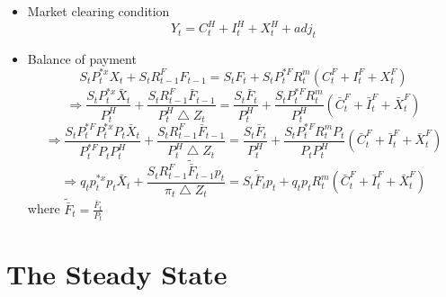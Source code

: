 \documentclass[11pt, a4paper]{article}
\begin{document}
\begin{itemize}
\item Market clearing condition
\[Y_t = C_t^H + I_t^H + X_t^H + adj_t\]
\item Balance of payment 
\[ S_t P_t^{*x}X_t + S_t R_{t-1}^F F_{t-1} = S_t F_t + S_t P_t^{*F}R_t^m (C_t^F + I_t^F + X_t^F)\]
\begin{equation*}
\Rightarrow \frac{S_t P_t^{*x}\bar{X}_t}{P_t^H} + \frac{S_t R_{t-1}^F \bar{F}_{t-1}}{P_t^H \bigtriangleup Z_t} = \frac{S_t \bar{F}_t}{P_t^H} + \frac{S_t P_t^{*F}R_t^m}{P_t^H} (\bar{C}_t^F + \bar{I}_t^F + \bar{X}_t^F)
\end{equation*}
\begin{equation*}
\Rightarrow \frac{S_t P_t^{*F} P_t^{*x}P_t\bar{X}_t}{P_t^{*F} P_t P_t^H} + \frac{S_t R_{t-1}^F \bar{F}_{t-1}}{P_t^H \bigtriangleup Z_t} = \frac{S_t \bar{F}_t}{P_t^H} + \frac{S_t P_t^{*F}R_t^m P_t }{P_t P_t^H} (\bar{C}_t^F + \bar{I}_t^F + \bar{X}_t^F)
\end{equation*}
\begin{equation}
\Rightarrow {q_t p_t^{*x}p_t\bar{X}_t} + \frac{S_t R_{t-1}^F \tilde{\bar{F}}_{t-1}p_t}{ \pi_t \bigtriangleup Z_t} = {S_t \tilde{\bar{F}}_t p_t} + {q_t p_t R_t^m }(\bar{C}_t^F + \bar{I}_t^F + \bar{X}_t^F)
\end{equation} 
where $\tilde{\bar{F}}_t =\frac{\bar{F}_t}{P_t}$
  \end{itemize}


\pagebreak
{}
\section{The Steady State}
\end{document}
